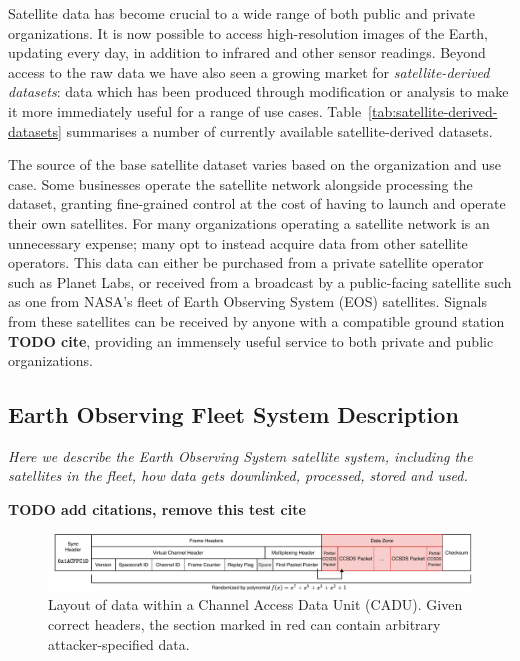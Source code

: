 Satellite data has become crucial to a wide range of both public and private organizations.
It is now possible to access high-resolution images of the Earth, updating every day, in addition to infrared and other sensor readings.
Beyond access to the raw data we have also seen a growing market for \textit{satellite-derived datasets}: data which has been produced through modification or analysis to make it more immediately useful for a range of use cases.
Table~\ref{tab:satellite-derived-datasets} summarises a number of currently available satellite-derived datasets.

The source of the base satellite dataset varies based on the organization and use case.
Some businesses operate the satellite network alongside processing the dataset, granting fine-grained control at the cost of having to launch and operate their own satellites.
For many organizations operating a satellite network is an unnecessary expense; many opt to instead acquire data from other satellite operators.
This data can either be purchased from a private satellite operator such as Planet Labs, or received from a broadcast by a public-facing satellite such as one from NASA's fleet of Earth Observing System (EOS) satellites.
Signals from these satellites can be received by anyone with a compatible ground station \textbf{TODO cite}, providing an immensely useful service to both private and public organizations.


\subsection{Earth Observing Fleet System Description}

\textit{Here we describe the Earth Observing System satellite system, including the satellites in the fleet, how data gets downlinked, processed, stored and used.}



\textbf{TODO add citations, remove this test cite}~\cite{moser2019digital}

\begin{figure}
    \centering
    \includegraphics[width=\textwidth]{diagrams/cadu_diagram.pdf}
    \caption{Layout of data within a Channel Access Data Unit (CADU). Given correct headers, the section marked in red can contain arbitrary attacker-specified data.}
    \label{fig:cadu_diagram}
\end{figure}

